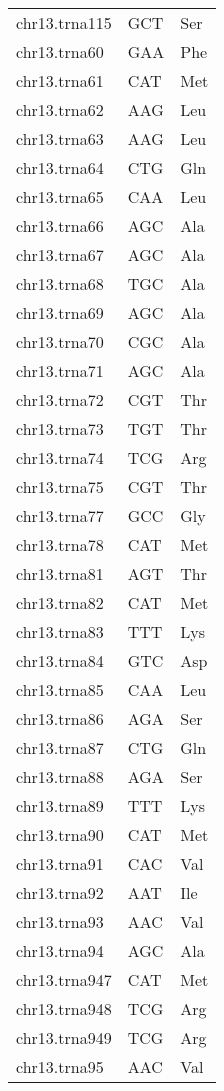 \begin{longtable}{@{}l>{\collectcell\anticodon}l<{\endcollectcell}l@{}}
    chr13.trna115 & GCT & Ser \\
    chr13.trna60 & GAA & Phe \\
    chr13.trna61 & CAT & Met \\
    chr13.trna62 & AAG & Leu \\
    chr13.trna63 & AAG & Leu \\
    chr13.trna64 & CTG & Gln \\
    chr13.trna65 & CAA & Leu \\
    chr13.trna66 & AGC & Ala \\
    chr13.trna67 & AGC & Ala \\
    chr13.trna68 & TGC & Ala \\
    chr13.trna69 & AGC & Ala \\
    chr13.trna70 & CGC & Ala \\
    chr13.trna71 & AGC & Ala \\
    chr13.trna72 & CGT & Thr \\
    chr13.trna73 & TGT & Thr \\
    chr13.trna74 & TCG & Arg \\
    chr13.trna75 & CGT & Thr \\
    chr13.trna77 & GCC & Gly \\
    chr13.trna78 & CAT & Met \\
    chr13.trna81 & AGT & Thr \\
    chr13.trna82 & CAT & Met \\
    chr13.trna83 & TTT & Lys \\
    chr13.trna84 & GTC & Asp \\
    chr13.trna85 & CAA & Leu \\
    chr13.trna86 & AGA & Ser \\
    chr13.trna87 & CTG & Gln \\
    chr13.trna88 & AGA & Ser \\
    chr13.trna89 & TTT & Lys \\
    chr13.trna90 & CAT & Met \\
    chr13.trna91 & CAC & Val \\
    chr13.trna92 & AAT & Ile \\
    chr13.trna93 & AAC & Val \\
    chr13.trna94 & AGC & Ala \\
    chr13.trna947 & CAT & Met \\
    chr13.trna948 & TCG & Arg \\
    chr13.trna949 & TCG & Arg \\
    chr13.trna95 & AAC & Val \\

\end{longtable}
